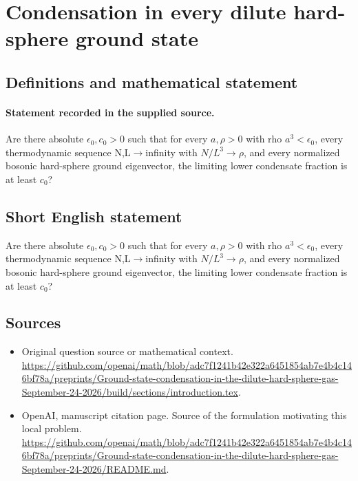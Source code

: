 \documentclass[11pt]{article}
\begin{document}
\section*{Condensation in every dilute hard-sphere ground state}\label{statement}
\subsection{Definitions and mathematical statement}
\paragraph{Statement recorded in the supplied source.}
Are there absolute $\epsilon _0,c_0>0$ such that for every $a,\rho >0$ with rho $a^3<\epsilon _0$, every thermodynamic sequence N,L$\to$infinity with $N/L^3\to \rho $, and every normalized bosonic hard-sphere ground eigenvector, the limiting lower condensate fraction is at least $c_0$?
\subsection{Short English statement}
Are there absolute $\epsilon _0,c_0>0$ such that for every $a,\rho >0$ with rho $a^3<\epsilon _0$, every thermodynamic sequence N,L$\to$infinity with $N/L^3\to \rho $, and every normalized bosonic hard-sphere ground eigenvector, the limiting lower condensate fraction is at least $c_0$?
\subsection{Sources}
\begin{itemize}
\item[S1] Original question source or mathematical context.
\url{https://github.com/openai/math/blob/adc7f1241b42e322a6451854ab7e4b4c146bf78a/preprints/Ground-state-condensation-in-the-dilute-hard-sphere-gas-September-24-2026/build/sections/introduction.tex}.
\item[S2] OpenAI, manuscript citation page. Source of the formulation motivating this local problem.
\url{https://github.com/openai/math/blob/adc7f1241b42e322a6451854ab7e4b4c146bf78a/preprints/Ground-state-condensation-in-the-dilute-hard-sphere-gas-September-24-2026/README.md}.
\end{itemize}
\end{document}
